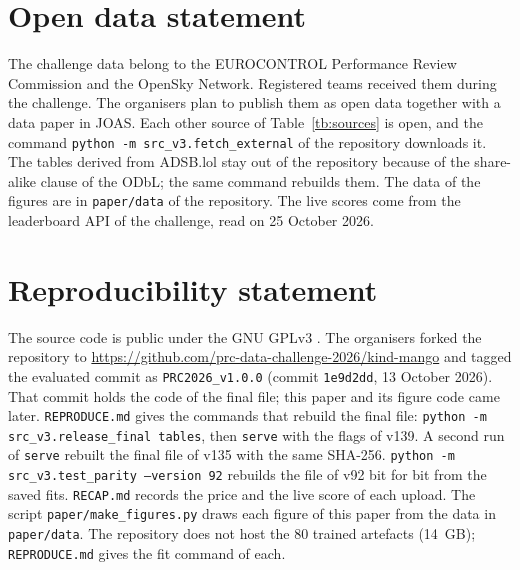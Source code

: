 \documentclass[
  manuscript=article,
  layout=preprint,
  year=2026,
  volume=x,
]{extra/joas}
\begin{document}
\section*{Open data statement}
The challenge data belong to the EUROCONTROL Performance Review Commission and the OpenSky Network. Registered teams received them during the challenge. The organisers plan to publish them as open data together with a data paper in JOAS.
Each other source of Table~\ref{tb:sources} is open, and the command \texttt{python -m src\_v3.fetch\_external} of the repository downloads it. The tables derived from ADSB.lol stay out of the repository because of the share-alike clause of the ODbL; the same command rebuilds them. The data of the figures are in \texttt{paper/data} of the repository. The live scores come from the leaderboard API of the challenge, read on 25 October 2026.

\section*{Reproducibility statement}
The source code is public under the GNU GPLv3 \cite{kindmango2026repo}. The organisers forked the repository to \url{https://github.com/prc-data-challenge-2026/kind-mango} and tagged the evaluated commit as \texttt{PRC2026\_v1.0.0} (commit \texttt{1e9d2dd}, 13 October 2026). That commit holds the code of the final file; this paper and its figure code came later.
\texttt{REPRODUCE.md} gives the commands that rebuild the final file: \texttt{python -m src\_v3.release\_final tables}, then \texttt{serve} with the flags of v139. A second run of \texttt{serve} rebuilt the final file of v135 with the same SHA-256. \texttt{python -m src\_v3.test\_parity --version 92} rebuilds the file of v92 bit for bit from the saved fits. \texttt{RECAP.md} records the price and the live score of each upload. The script \texttt{paper/make\_figures.py} draws each figure of this paper from the data in \texttt{paper/data}. The repository does not host the 80 trained artefacts (14~GB); \texttt{REPRODUCE.md} gives the fit command of each.

\printbibliography
\end{document}
